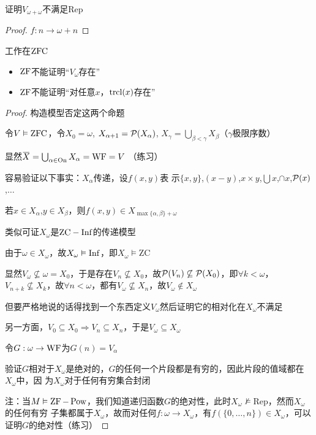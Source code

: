 \documentclass[11pt]{article}
\def \Rep {\text{Rep}}
\def \ZC {\text{ZC}}
\begin{document}
\begin{exercise}
证明\(V_{\omega+\omega}\)不满足Rep
\end{exercise}

\begin{proof}
\(f:n\to\omega+n\)
\end{proof}

\begin{proposition}[]
工作在\(\operatorname{ZFC}\)
\begin{itemize}
\item \(\operatorname{ZF}\)不能证明“\(V_\omega\)存在”
\item \(\operatorname{ZF}\)不能证明“对任意\(x\)，\(\operatorname{\text{trcl}}(x)\)存在”
\end{itemize}
\end{proposition}

\begin{proof}
构造模型否定这两个命题

令\(V\vDash\operatorname{ZFC}\)，令\(X_0=\omega\), \(X_{\alpha+1}=\mathcal{P}(X_\alpha)\), \(X_\gamma=\bigcup_{\beta<\gamma}X_\beta\)（\(\gamma\)极限序数）

显然\(\barX=\bigcup_{\alpha\in\On}X_\alpha=\WF=V\) （练习）

容易验证以下事实：\(X_\alpha\)传递，设\(f(x,y)\)表
示\(\{x,y\}\),\((x-y)\),\(x\times y\),\(\bigcup x\),\(\cap x\),\(\mathcal{P}(x)\),\(\dots\)

若\(x\in X_\alpha\),\(y\in X_\beta\)，则\(f(x,y)\in X_{\max\{\alpha,\beta\}+\omega}\)

类似可证\(X_\omega\)是\(\ZC-\Inf\)的传递模型

由于\(\omega\in X_\omega\)，故\(X_\omega\vDash\operatorname{Inf}\)，即\(X_\omega\vDash\ZC\)

显然\(V_\omega\not\subseteq\omega=X_0\)，于是存在\(V_n\not\subseteq X_0\)，故\(\mathcal{P}(V_n)\not\subseteq\mathcal{P}(X_0)\)，即\(\forall k<\omega\)，
\(V_{n+k}\not\subseteq X_k\)，故\(\forall n<\omega\)，都有\(V_\omega\not\subseteq X_n\)，故\(V_\omega\notin X_\omega\)

但要严格地说的话得找到一个东西定义\(V_\omega\)然后证明它的相对化在\(X_\omega\)不满足

另一方面，\(V_0\subseteq X_0\Rightarrow V_n\subseteq X_n\)，于是\(V_\omega\subseteq X_\omega\)

令\(G:\omega\to\operatorname{WF}\)为\(G(n)=V_\alpha\)

验证\(G\)相对于\(X_\omega\)是绝对的，\(G\)的任何一个片段都是有穷的，因此片段的值域都在\(X_\omega\)中，因
为\(X_\omega\)对于任何有穷集合封闭

注：当\(M\vDash\operatorname{ZF}-\operatorname{Pow}\)，我们知道递归函数\(G\)的绝对性，此时\(X_\omega\not\vDash\Rep\)，然而\(X_\omega\)的任何有穷
子集都属于\(X_\omega\)，故而对任何\(f:\omega\to X_\omega\)，有\(f(\{0,\dots,n\})\in X_\omega\)，可以证明\(G\)的绝对性（练习）


\end{proof}
\end{document}
